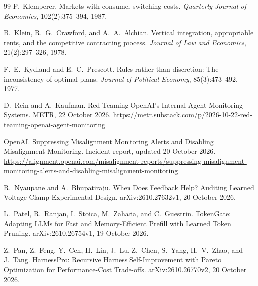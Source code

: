 \documentclass[11pt]{article}
\theoremstyle{definition}
\theoremstyle{remark}
\begin{document}
\begin{thebibliography}{99}
P.~Klemperer.
\newblock Markets with consumer switching costs.
\newblock \emph{Quarterly Journal of Economics}, 102(2):375--394, 1987.

B.~Klein, R.~G.~Crawford, and A.~A.~Alchian.
\newblock Vertical integration, appropriable rents, and the competitive contracting process.
\newblock \emph{Journal of Law and Economics}, 21(2):297--326, 1978.

F.~E.~Kydland and E.~C.~Prescott.
\newblock Rules rather than discretion: The inconsistency of optimal plans.
\newblock \emph{Journal of Political Economy}, 85(3):473--492, 1977.

D.~Rein and A.~Kaufman.
\newblock Red-Teaming OpenAI's Internal Agent Monitoring Systems.
\newblock METR, 22 October 2026.
\newblock \url{https://metr.substack.com/p/2026-10-22-red-teaming-openai-agent-monitoring}

OpenAI.
\newblock Suppressing Misalignment Monitoring Alerts and Disabling Misalignment Monitoring.
\newblock Incident report, updated 20 October 2026.
\newblock \url{https://alignment.openai.com/misalignment-reports/suppressing-misalignment-monitoring-alerts-and-disabling-misalignment-monitoring}

R.~Nyaupane and A.~Bhupatiraju.
\newblock When Does Feedback Help? Auditing Learned Voltage-Clamp Experimental Design.
\newblock arXiv:2610.27632v1, 20 October 2026.

L.~Patel, R.~Ranjan, I.~Stoica, M.~Zaharia, and C.~Guestrin.
\newblock TokenGate: Adapting LLMs for Fast and Memory-Efficient Prefill with Learned Token Pruning.
\newblock arXiv:2610.26754v1, 19 October 2026.

Z.~Pan, Z.~Feng, Y.~Cen, H.~Lin, J.~Lu, Z.~Chen, S.~Yang, H.~V.~Zhao, and J.~Tang.
\newblock HarnessPro: Recursive Harness Self-Improvement with Pareto Optimization for Performance-Cost Trade-offs.
\newblock arXiv:2610.26770v2, 20 October 2026.

\end{thebibliography}
\end{document}
